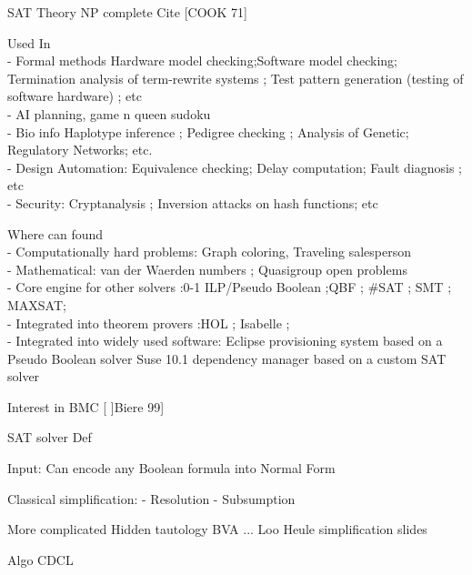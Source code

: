 


SAT Theory NP complete Cite [COOK 71]

Used In\\
- Formal methods Hardware model checking;Software model checking;
Termination analysis of term-rewrite systems ; Test pattern generation 
(testing of software hardware) ; etc\\
- AI planning, game n queen sudoku \\
- Bio info Haplotype inference ; Pedigree checking ; Analysis of Genetic; Regulatory Networks; etc.\\
- Design Automation: Equivalence checking; Delay computation; Fault diagnosis ; etc\\
- Security: Cryptanalysis ; Inversion attacks on hash functions; etc


Where can found \\
- Computationally hard problems: Graph coloring, Traveling salesperson\\
- Mathematical: van der Waerden numbers ; Quasigroup open problems  \\
- Core engine for other solvers :0-1 ILP/Pseudo Boolean ;QBF ; \#SAT ; SMT ; MAXSAT;\\ 
- Integrated into theorem provers :HOL ; Isabelle ;\\

- Integrated into widely used software: Eclipse provisioning system based on a Pseudo Boolean solver
Suse 10.1 dependency manager based on a custom SAT solver

Interest in BMC [ ]Biere 99]


SAT solver Def


Input: Can encode any Boolean formula into Normal Form

Classical simplification:
- Resolution
- Subsumption

More complicated
Hidden tautology
BVA
...
Loo Heule simplification slides


Algo CDCL

